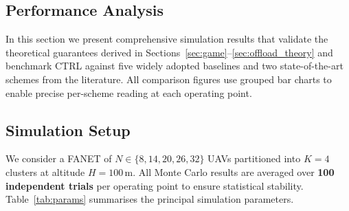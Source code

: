 \documentclass[journal]{IEEEtran}
\begin{document}
\begin{IEEEproof}

\section{Performance Analysis}
\label{sec:eval}

In this section we present comprehensive simulation results that
validate the theoretical guarantees derived in
Sections~\ref{sec:game}--\ref{sec:offload_theory} and benchmark
CTRL against five widely adopted baselines and two state-of-the-art
schemes from the literature.  All comparison figures use grouped bar
charts to enable precise per-scheme reading at each operating point.

\subsection{Simulation Setup}
\label{sec:setup}

We consider a FANET of $N \in \{8, 14, 20, 26, 32\}$ UAVs partitioned
into $K = 4$ clusters at altitude $H = 100$\,m.  All Monte Carlo results
are averaged over \textbf{100 independent trials} per operating point to
ensure statistical stability.  Table~\ref{tab:params} summarises the
principal simulation parameters.


\end{IEEEproof}
\end{document}
